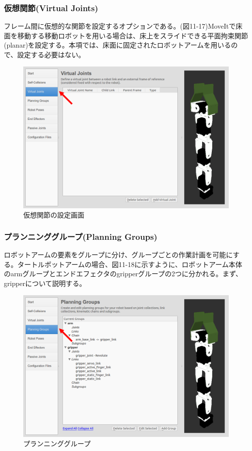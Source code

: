 \subsubsection{仮想関節(Virtual Joints)}

フレーム間に仮想的な関節を設定するオプションである。(図11-17)MoveItで床面を移動する移動ロボットを用いる場合は、床上をスライドできる平面拘束関節(planar)を設定する。本項では、床面に固定されたロボットアームを用いるので、設定する必要はない。

\begin{figure}[htp]
  \centering
  \includegraphics[width=12cm]{pictures/chapter11/pic_11_17.png}
  \caption{仮想関節の設定画面}
\end{figure}

\subsubsection{プランニンググループ(Planning Groups)}

ロボットアームの要素をグループに分け、グループごとの作業計画を可能にする。タートルボットアームの場合、図11-18に示すように、ロボットアーム本体のarmグループとエンドエフェクタのgripperグループの2つに分かれる。まず、gripperについて説明する。

\begin{figure}[htp]
  \centering
  \includegraphics[width=12cm]{pictures/chapter11/pic_11_18.png}
  \caption{プランニンググループ}
\end{figure}

